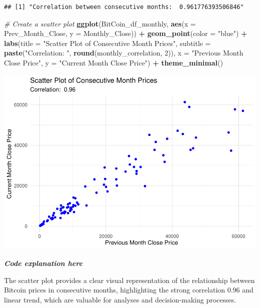 \documentclass[
]{book}
\newenvironment{Shaded}{\begin{snugshade}}{\end{snugshade}}
\newcommand{\AttributeTok}[1]{\textcolor[rgb]{0.13,0.29,0.53}{#1}}
\newcommand{\CommentTok}[1]{\textcolor[rgb]{0.56,0.35,0.01}{\textit{#1}}}
\newcommand{\DecValTok}[1]{\textcolor[rgb]{0.00,0.00,0.81}{#1}}
\newcommand{\FunctionTok}[1]{\textcolor[rgb]{0.13,0.29,0.53}{\textbf{#1}}}
\newcommand{\NormalTok}[1]{#1}
\newcommand{\SpecialCharTok}[1]{\textcolor[rgb]{0.81,0.36,0.00}{\textbf{#1}}}
\newcommand{\StringTok}[1]{\textcolor[rgb]{0.31,0.60,0.02}{#1}}
\begin{document}
\begin{verbatim}
## [1] "Correlation between consecutive months:  0.961776393506846"
\end{verbatim}

\begin{Shaded}
\begin{Highlighting}[]
\CommentTok{\# Create a scatter plot}
\FunctionTok{ggplot}\NormalTok{(BitCoin\_df\_monthly, }\FunctionTok{aes}\NormalTok{(}\AttributeTok{x =}\NormalTok{ Prev\_Month\_Close, }\AttributeTok{y =}\NormalTok{ Monthly\_Close)) }\SpecialCharTok{+}
  \FunctionTok{geom\_point}\NormalTok{(}\AttributeTok{color =} \StringTok{"blue"}\NormalTok{) }\SpecialCharTok{+}
  \FunctionTok{labs}\NormalTok{(}\AttributeTok{title =} \StringTok{"Scatter Plot of Consecutive Month Prices"}\NormalTok{,}
       \AttributeTok{subtitle =} \FunctionTok{paste}\NormalTok{(}\StringTok{"Correlation: "}\NormalTok{, }\FunctionTok{round}\NormalTok{(monthly\_correlation, }\DecValTok{2}\NormalTok{)),}
       \AttributeTok{x =} \StringTok{"Previous Month Close Price"}\NormalTok{,}
       \AttributeTok{y =} \StringTok{"Current Month Close Price"}\NormalTok{) }\SpecialCharTok{+}
  \FunctionTok{theme\_minimal}\NormalTok{()}
\end{Highlighting}
\end{Shaded}

\includegraphics{bookdown-demo_files/figure-latex/unnamed-chunk-14-1.pdf}

\emph{\textbf{Code explanation here}}

The scatter plot provides a clear visual representation of the relationship between Bitcoin prices in consecutive months, highlighting the strong correlation 0.96 and linear trend, which are valuable for analyses and decision-making processes.
\end{document}
